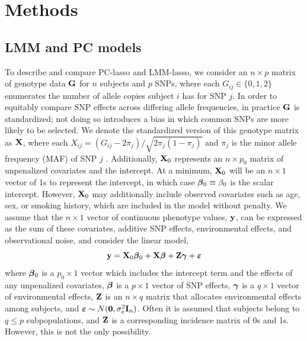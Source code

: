 \section{Methods} \label{sec:methods}



\subsection{LMM and PC models}
\label{Sec:lmm-and-pc}

To describe and compare PC-lasso and LMM-lasso, we consider an $n \times p$ matrix of genotype data $\mathbf{G}$ for $n$ subjects and $p$ SNPs, where each $G_{ij} \in \{ 0, 1, 2 \}$ enumerates the number of allele copies subject $i$ has for SNP $j$. In order to equitably compare SNP effects across differing allele frequencies, in practice $\mathbf{G}$ is standardized; not doing so introduces a bias in which common SNPs are more likely to be selected. We denote the standardized version of this genotype matrix as $\mathbf{X}$, where each $X_{ij} = (G_{ij} - 2 \pi_j) / \sqrt{2\pi_j (1 - \pi_j)}$ and $\pi_j$ is the minor allele frequency (MAF) of SNP $j$ \citep{zhang2015principal, price2006principal}. Additionally, $\mathbf{X}_0$ represents an $n \times p_0$ matrix of unpenalized covariates and the intercept. At a minimum, $\mathbf{X}_0$ will be an $n \times 1$ vector of 1s to represent the intercept, in which case $\boldsymbol{\beta}{}_0 \equiv \beta_0$ is the scalar intercept. However, $\mathbf{X}_0$ may additionally include observed covariates such as age, sex, or smoking history, which are included in the model without penalty. We assume that the $n \times 1$ vector of continuous phenotype values, $\mathbf{y}$, can be expressed as the sum of these covariates, additive SNP effects, environmental effects, and observational noise, and consider the linear model,
\begin{equation}
    \label{eqn:model}
    \mathbf{y} = \mathbf{X}_0 \boldsymbol{\beta}{}_0 + \mathbf{X}\boldsymbol{\beta}{} + \mathbf{Z}\boldsymbol{\gamma} + \boldsymbol{\varepsilon}{}
\end{equation}
where $\boldsymbol{\beta}{}_0$ is a $p_0 \times 1$ vector which includes the intercept term and the effects of any unpenalized covariates, $\boldsymbol{\beta}{}$ is a $p \times 1$ vector of SNP effects, $\boldsymbol{\gamma}$ is a $q \times 1$ vector of environmental effects, $\mathbf{Z}$ is an $n \times q$ matrix that allocates environmental effects among subjects, and $\boldsymbol{\varepsilon}{} \sim N(\boldsymbol{0}, \sigma^2_e \mathbf{I}_n)$. Often it is assumed that subjects belong to $q \le p$ subpopulations, and $\mathbf{Z}$ is a corresponding incidence matrix of 0s and 1s. However, this is not the only possibility.

